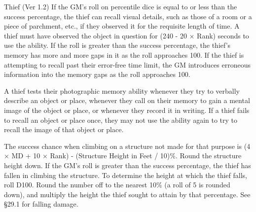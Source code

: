\begin{Chapter}{Thief (Ver 1.2)}
If the GM’s roll on percentile dice is equal to or less than the
success percentage, the thief can recall visual details, such as those
of a room or a piece of parchment, etc., if they observed it for the
requisite length of time.  A thief must have observed the object in
question for (240 - 20 × Rank) seconds to use the ability. If the roll
is greater than the success percentage, the thief’s memory has more
and more gaps in it as the roll approaches 100.  If the thief is
attempting to recall past their error-free time limit, the GM
introduces erroneous information into the memory gaps as the roll
approaches 100.

A thief tests their photographic memory ability whenever they try to
verbally describe an object or place, whenever they call on their
memory to gain a mental image of the object or place, or whenever they
record it in writing. If a thief fails to recall an object or place
once, they may not use the ability again to try to recall the image of
that object or place.



The success chance when climbing on a structure not made for that
purpose is (4 × MD + 10 × Rank) - (Structure Height in Feet / 10)\%.
Round the structure height down.  If the GM’s roll is greater than the
success percentage, the thief has fallen in climbing the structure.
To determine the height at which the thief falls, roll D100. Round the
number off to the nearest 10\% (a roll of 5 is rounded down), and
multiply the height the thief sought to attain by that percentage.
See §29.1 for falling damage.

\end{Chapter}
